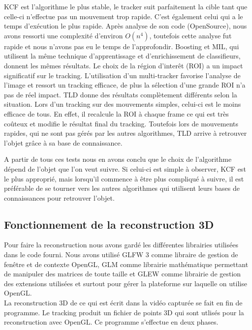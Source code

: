 KCF est l'algorithme le plus stable, le tracker suit parfaitement la cible tant que celle-ci n'effectue pas un mouvement trop rapide. C'est également celui qui a le temps d'exécution le plus rapide. Après analyse de son code (OpenSource), nous avons ressorti une complexité d'environ $O(n^{4})$, toutefois cette analyse fut rapide et nous n'avons pas eu le temps de l'approfondir.
Boosting et MIL, qui utilisent la même technique d'apprentissage et d'enrichissement de classifieurs, donnent les mêmes résultats. Le choix de la région d'interêt (ROI) a un impact significatif sur le tracking. L'utilisation d'un multi-tracker favorise l'analyse de l'image et ressort un tracking efficace, de plus la sélection d'une grande ROI n'a pas de réel impact.
TLD donne des résultats complètement différents selon la situation. Lors d'un tracking sur des mouvements simples, celui-ci est le moins efficace de tous. En effet, il recalcule la ROI à chaque frame ce qui est très coûteux et modifie le résultat final du tracking. Toutefois lors de mouvements rapides, qui ne sont pas gérés par les autres algorithmes, TLD arrive à retrouver  l'objet grâce à sa base de connaissance.

A partir de tous ces tests nous en avons conclu que le choix de l'algorithme dépend de l'objet que l'on veut suivre. Si celui-ci est simple à observer, KCF est le plus approprié, mais lorsqu'il commence à être plus compliqué à suivre, il est préférable de se tourner vers les autres algorithmes qui utilisent leurs bases de connaissances pour retrouver l'objet.

\subsection{Fonctionnement de la reconstruction 3D}

Pour faire la reconstruction nous avons gardé les différentes librairies utilisées dans le code fourni. Nous avons utilisé GLFW 3 comme libraire de gestion de fenêtre et de contexte OpenGL, GLM comme librairie mathématique permettant de manipuler des matrices de toute taille et GLEW comme librairie de gestion des extensions utilisées et surtout pour gérer la plateforme sur laquelle on utilise OpenGL. \\
 
La reconstruction 3D de ce qui est écrit dans la vidéo capturée se fait en fin de programme. Le tracking produit un fichier de points 3D qui sont utlisés pour la reconstruction avec OpenGL. Ce programme s'effectue en deux phases. \\


